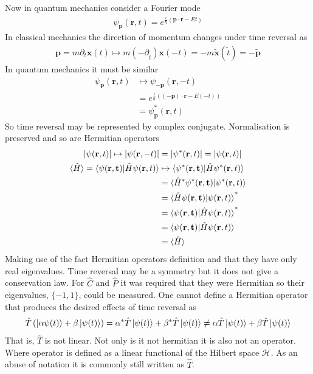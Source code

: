 Now in quantum mechanics consider a Fourier mode
\begin{align*}
\psi_\mathbf{p}(\mathbf{r},t) = e^{\frac{i}{\hbar}(\mathbf{p}\cdot\mathbf{r}-Et)}
\end{align*}
In classical mechanics the direction of momentum changes under time reversal as
\begin{align*}
\mathbf{p} = m\partial_t \mathbf{x}(t) \mapsto m (-\partial_{\tilde{t}})\mathbf{x}(-t) = -m\mathbf{\tilde{x}}(\tilde{t}) = -\mathbf{\tilde{p}}
\end{align*}
In quantum mechanics it must be similar
\begin{align*}
\psi_\mathbf{p}(\mathbf{r},t)&\mapsto \psi_{-\mathbf{p}}(\mathbf{r},-t) \\
&=e^{\frac{i}{\hbar}((-\mathbf{p})\cdot\mathbf{r}-E(-t))} \\
&=\psi_\mathbf{p}^*(\mathbf{r},t)
\end{align*}
So time reversal may be represented by complex conjugate. Normalisation is preserved and so are Hermitian operators
\begin{align*}
|\psi(\mathbf{r},t)| \mapsto |\psi(\mathbf{r},-t)|&=|\psi^*(\mathbf{r},t)|=|\psi(\mathbf{r},t)| \\
\braket{\hat{H}}=\braket{\psi(\mathbf{r,t})|\hat{H}\psi(\mathbf{r},t)}&\mapsto \braket{\psi^*(\mathbf{r,t})|\hat{H}\psi^*(\mathbf{r},t)} \\
&= \braket{\hat{H}^*\psi^*(\mathbf{r,t})|\psi^*(\mathbf{r},t)} \\
&= \braket{\hat{H}\psi(\mathbf{r,t})|\psi(\mathbf{r},t)}^* \\
&= \braket{\psi(\mathbf{r,t})|\hat{H}\psi(\mathbf{r},t)}^* \\
&= \braket{\psi(\mathbf{r,t})|\hat{H}\psi(\mathbf{r},t)} \\
&= \braket{\hat{H}}
\end{align*}
Making use of the fact Hermitian operators definition and that they have only real eigenvalues. Time reversal may be a symmetry but it does not give a conservation law. For $\hat{C}$ and $\hat{P}$ it was required that they were Hermitian so their eigenvalues, $\{-1,1\}$, could be measured. One cannot define a Hermitian operator that produces the desired effects of time reversal as
\begin{align*}
\hat{T}\left(\ket{\alpha\psi(t)}+\beta \ket{\psi(t)}\right) = \alpha^*\hat{T} \ket{\psi(t)}+\beta^*\hat{T} \ket{ \psi(t)} \neq  \alpha\hat{T} \ket{\psi(t)}+\beta\hat{T} \ket{ \psi(t)}
\end{align*}
That is, $\hat{T}$ is not linear. Not only is it not hermitian it is also not an operator. Where operator is defined as a linear functional of the Hilbert space $\mathcal{H}$. As an abuse of notation it is commonly still written as $\hat{T}$.

